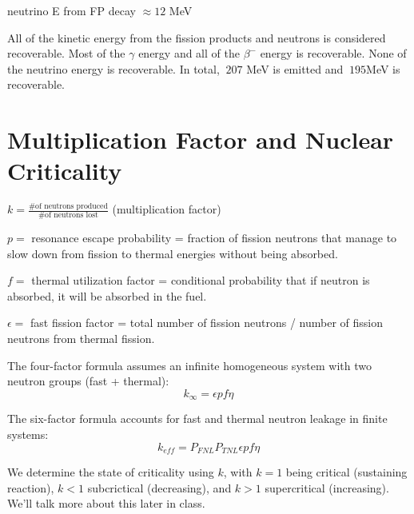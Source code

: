 \documentclass[12pt]{article}
\begin{document}
neutrino E from FP decay $\approx 12$ MeV
\else
\vspace*{6 em}
\fi

All of the kinetic energy from the fission products and neutrons is considered recoverable. Most of the $\gamma$ energy and all of the $\beta^-$ energy is recoverable. None of the neutrino energy is recoverable. In total, $~207$ MeV is emitted and $~195$MeV is recoverable.

\section*{Multiplication Factor and Nuclear Criticality}

$k=\frac{\text{\# of neutrons produced}}{\text{\# of neutrons lost}}$ (multiplication factor)

$p=$ resonance escape probability = fraction of fission neutrons that manage to slow down from fission to thermal energies without being absorbed.

$f=$ thermal utilization factor = conditional probability that if neutron is absorbed, it will be absorbed in the fuel.

$\epsilon=$ fast fission factor = total number of fission neutrons / number of fission neutrons from thermal fission.

The four-factor formula assumes an infinite homogeneous system with two neutron groups (fast + thermal):
\[
k_{\infty}=\epsilon p f \eta
\]

The six-factor formula accounts for fast and thermal neutron leakage in finite systems:
\[
k_{eff} = P_{FNL}P_{TNL}\epsilon p f\eta
\]

We determine the state of criticality using $k$, with $k=1$ being critical (sustaining reaction), $k<1$ subcrictical (decreasing), and $k>1$ supercritical (increasing). We'll talk more about this later in class.
\end{document}
